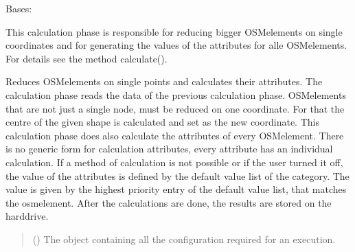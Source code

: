 \documentclass[letterpaper,10pt,english]{sphinxmanual}
\begin{document}
\begin{fulllineitems}
\label{\detokenize{apidoc/src.osm_configurator.model.project.calculation:src.osm_configurator.model.project.calculation.reduction_phase.ReductionPhase}}
\pysigstartsignatures
{}
\pysigstopsignatures
\sphinxAtStartPar
Bases: {\hyperref[\detokenize{apidoc/src.osm_configurator.model.project.calculation:src.osm_configurator.model.project.calculation.calculation_phase_interface.ICalculationPhase}]{}}

\sphinxAtStartPar
This calculation phase is responsible for reducing bigger OSM\sphinxhyphen{}elements on single coordinates and for generating
the values of the attributes for alle OSM\sphinxhyphen{}elements.
For details see the method calculate().

\begin{fulllineitems}
\label{\detokenize{apidoc/src.osm_configurator.model.project.calculation:src.osm_configurator.model.project.calculation.reduction_phase.ReductionPhase.calculate}}
\pysigstartsignatures
{}
\pysigstopsignatures
\sphinxAtStartPar
Reduces OSM\sphinxhyphen{}elements on single points and calculates their attributes.
The calculation phase reads the data of the previous calculation phase. OSM\sphinxhyphen{}elements that are not just a single
node, must be reduced on one coordinate. For that the centre of the given shape is calculated and set as the
new coordinate. This calculation phase does also calculate the attributes of every OSM\sphinxhyphen{}element. There is no
generic form for calculation attributes, every attribute has an individual calculation. If a method of
calculation is not possible or if the user turned it off, the value of the attributes is defined by the
default value list of the category. The value is given by the highest priority entry of the default value
list, that matches the osm\sphinxhyphen{}element. After the calculations are done, the results are stored on the hard\sphinxhyphen{}drive.
\begin{quote}\begin{description}
\sphinxAtStartPar
{} ({\hyperref[\detokenize{apidoc/src.osm_configurator.model.project.configuration:src.osm_configurator.model.project.configuration.configuration_manager.ConfigurationManager}]{}}) \textendash{} The object containing all the configuration required for an execution.


\end{description}
\end{quote}
\end{fulllineitems}
\end{fulllineitems}
\end{document}
